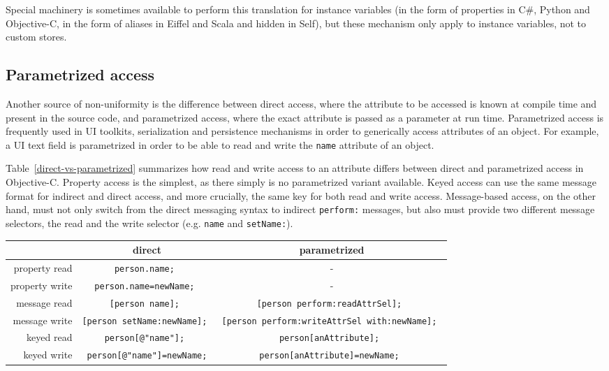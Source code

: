 \documentclass[preprint]{sigplanconf}
\begin{document}
  Special 
machinery is sometimes available to perform this translation for instance variables (in the form of 
properties in C\#, Python and Objective-C, in the form of aliases in Eiffel and Scala and hidden
in Self), but these mechanism only apply to instance variables, not to custom stores.



\subsection{Parametrized access}

Another source of non-uniformity is the difference between direct access, where the attribute
to be accessed is known at compile time and present in the source code, and parametrized
access, where the exact attribute is passed as a parameter at run time.  Parametrized access
is frequently used in UI toolkits, serialization and persistence mechanisms in order to generically
access attributes of an object.  For example, a
UI text field is parametrized in order to be able to read and write the {\tt name} attribute of
an object.

Table~\ref{direct-vs-parametrized}
summarizes how read and write access to an attribute differs between direct and parametrized
access in Objective-C.  Property access is the simplest, as there simply is no parametrized variant
available.  Keyed access can use the same message format for indirect and direct access, and
more crucially, the same key for both read and write access.  Message-based access, on the
other hand, must not only switch from the direct messaging syntax to indirect {\tt perform:}
messages, but also must provide two different message selectors, the read and the write
selector (e.g. {\tt name} and {\tt setName:}).

\begin{table*}[htbp]
\center
\begin{tabular}{|r|c|c|} \hline
   &  direct	 & parametrized  		 \\\hline 
property read 	 &   {\tt person.name;  }	&  -	 \\\hline 
property write 	 & {\tt person.name=newName; }	 & -		 \\\hline 
message read 	 &  {\tt  [person name]; }	 & {\tt [person perform:readAttrSel]; }		 \\\hline 
message write 	 & {\tt  [person setName:newName]; }	 & {\tt [person perform:writeAttrSel with:newName]; }		 \\\hline 
keyed read  & {\tt person[@"name"]; }	 & {\tt person[anAttribute];  }  \\\hline 
keyed write  & {\tt person[@"name"]=newName;}	 & {\tt person[anAttribute]=newName; }		 \\\hline 
\end{tabular}
\caption{Direct vs. parametrized access}
\label{direct-vs-parametrized}
\end{table*}
\end{document}
